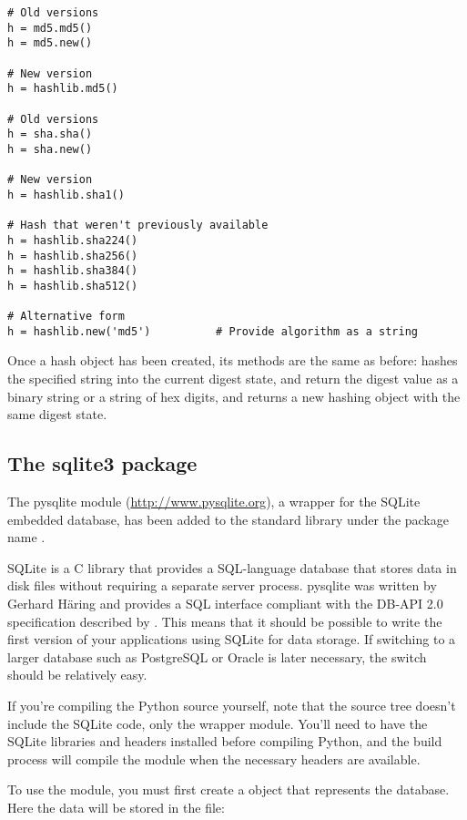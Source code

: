 \documentclass{howto}
\begin{document}
\begin{verbatim}
# Old versions
h = md5.md5()   
h = md5.new()   

# New version 
h = hashlib.md5()

# Old versions
h = sha.sha()   
h = sha.new()   

# New version 
h = hashlib.sha1()

# Hash that weren't previously available
h = hashlib.sha224()
h = hashlib.sha256()
h = hashlib.sha384()
h = hashlib.sha512()

# Alternative form
h = hashlib.new('md5')          # Provide algorithm as a string
\end{verbatim}

Once a hash object has been created, its methods are the same as before:
 hashes the specified string into the 
current digest state,  and 
return the digest value as a binary string or a string of hex digits,
and  returns a new hashing object with the same digest state.


\subsection{The sqlite3 package\label{module-sqlite}}

The pysqlite module (\url{http://www.pysqlite.org}), a wrapper for the
SQLite embedded database, has been added to the standard library under
the package name .  

SQLite is a C library that provides a SQL-language database that
stores data in disk files without requiring a separate server process.
pysqlite was written by Gerhard H\"aring and provides a SQL interface
compliant with the DB-API 2.0 specification described by
. This means that it should be possible to write the first
version of your applications using SQLite for data storage.  If
switching to a larger database such as PostgreSQL or Oracle is
later necessary, the switch should be relatively easy.

If you're compiling the Python source yourself, note that the source
tree doesn't include the SQLite code, only the wrapper module.
You'll need to have the SQLite libraries and headers installed before
compiling Python, and the build process will compile the module when
the necessary headers are available.

To use the module, you must first create a  object
that represents the database.  Here the data will be stored in the 
 file:
\end{document}
